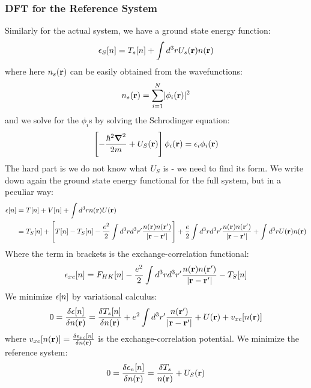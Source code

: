 \subsubsection{DFT for the Reference System}
Similarly for the actual system, we have a ground state energy function:
\begin{equation}
    \epsilon_S[n] = T_s[n] + \int d^3rU_s(\mathbf{r})n(\mathbf{r})
\end{equation}
where here $n_s(\mathbf{r})$ can be easily obtained from the wavefunctions:
\begin{equation}\label{eq-nrDFT}
    n_s(\mathbf{r}) = \sum_{i=1}^N \lvert \phi_i(\mathbf{r}) \rvert^2
\end{equation}
and we solve for the $\phi_i$s by solving the Schrodinger equation:
\begin{equation}\label{eq-SEDFT}
    \left[-\frac{\hbar^2\nabla^2}{2m} + U_S(\v{r})\right]\phi_i(\v{r}) = \e_i\phi_i(\v{r})
\end{equation}
The hard part is we do not know what $U_S$ is - we need to find its form. We write down again the ground state energy functional for the full system, but in a peculiar way:
\begin{equation}
    \begin{split}
        \epsilon[n] &= T[n] + V[n] + \int d^3rn(\mathbf{r})U(\mathbf{r}) \\ &= T_S[n] + \left[T[n] - T_S[n] - \frac{e^2}{2}\int d^3r d^3r' \frac{n(\mathbf{r})n(\mathbf{r}')}{\lvert \mathbf{r} - \mathbf{r}' \rvert}\right] + \frac{e}{2}\int d^3rd^3r' \frac{n(\mathbf{r})n(\mathbf{r}')}{\lvert \mathbf{r} - \mathbf{r}' \rvert} + \int d^3rU(\mathbf{r})n(\mathbf{r})
    \end{split}
\end{equation}
Where the term in brackets is the exchange-correlation functional:
\begin{equation}
    \epsilon_{xc}[n] = F_{HK}[n] - \frac{e^2}{2}\int d^3rd^3r'\frac{n(\mathbf{r})n(\mathbf{r}')}{\lvert \mathbf{r} - \mathbf{r}' \rvert} - T_S[n]
\end{equation}
We minimize $\epsilon[n]$ by variational calculus:
\begin{equation}\label{eq-fullEminimization}
    0 = \frac{\delta \epsilon[n]}{\delta n(\mathbf{r})} = \frac{\delta T_s[n]}{\delta n(\mathbf{r})} + e^2 \int d^3r'\frac{n(\mathbf{r}')}{\lvert \mathbf{r} - \mathbf{r}' \rvert} + U(\mathbf{r}) + v_{xc}[n(\mathbf{r})]
\end{equation}
where $v_{xc}[n(\mathbf{r})] = \frac{\delta \epsilon_{xc}[n]}{\delta n(\mathbf{r})}$ is the exchange-correlation potential. We minimize the reference system:
\begin{equation}
    0 = \frac{\delta \epsilon_n[n]}{\delta n(\mathbf{r})} = \frac{\delta T_s}{n(\mathbf{r})} + U_S(\mathbf{r})
\end{equation}
